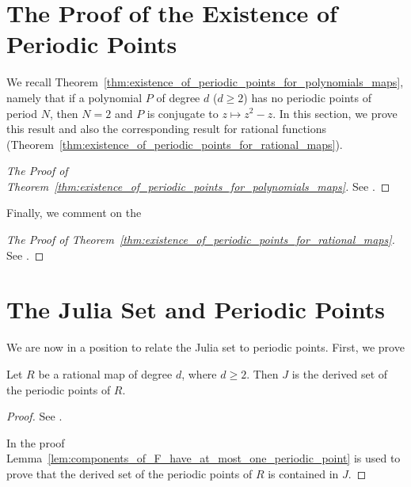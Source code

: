 \section{The Proof of the Existence of Periodic Points}
\label{sec:the_proof_of_the_existence_of_periodic_points}

We recall Theorem~\ref{thm:existence_of_periodic_points_for_polynomials_maps},
namely that if a polynomial $P$ of degree $d$ ($d \geq 2$) has no periodic
points of period $N$, then $N = 2$ and $P$ is conjugate to $z \mapsto z^2 - z$.
In this section, we prove this result and also the corresponding result for
rational functions
(Theorem~\ref{thm:existence_of_periodic_points_for_rational_maps}).

\begin{proof}[The Proof of Theorem~\ref{thm:existence_of_periodic_points_for_polynomials_maps}]
    See \cite[145--147]{Beardon1991}.
\end{proof}

Finally, we comment on the

\begin{proof}[The Proof of Theorem~\ref{thm:existence_of_periodic_points_for_rational_maps}]
    See \cite[147--148]{Beardon1991}.
\end{proof}

\section{The Julia Set and Periodic Points}
\label{sec:the_Julia_set_and_periodic_points}

We are now in a position to relate the Julia set to periodic points. First, we
prove

\begin{theorem}[$J = \derived{\{\text{periodic points}\}}$]
    \label{thm:J_is_the_derived_set_of_the_periodic_points}
    Let $R$ be a rational map of degree $d$, where $d \geq 2$. Then $J$ is the
    derived set of the periodic points of $R$.
\end{theorem}
\begin{proof}
    See \cite[148--149]{Beardon1991}.

    In the proof Lemma~\ref{lem:components_of_F_have_at_most_one_periodic_point}
    is used to prove that the derived set of the periodic points of $R$ is
    contained in $J$.
\end{proof}

